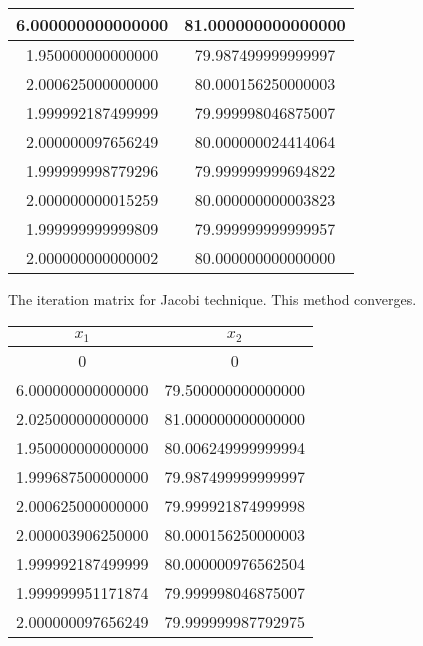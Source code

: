 \documentclass[11pt]{article}
\begin{document}
\begin{exercise}{3}
{\begin{enumerate}[label=\alph*)]
\begin{center}
\begin{tabular}{|c|c|}
                        6.000000000000000 &  81.000000000000000 \\ \hline
                        1.950000000000000 &  79.987499999999997 \\ \hline
                        2.000625000000000 &  80.000156250000003 \\ \hline
                        1.999992187499999 &  79.999998046875007 \\ \hline
                        2.000000097656249 &  80.000000024414064 \\ \hline
                        1.999999998779296 &  79.999999999694822 \\ \hline
                        2.000000000015259 &  80.000000000003823 \\ \hline
                        1.999999999999809 &  79.999999999999957 \\ \hline
                        2.000000000000002 &  80.000000000000000 \\ \hline
                    \end{tabular}
                \end{center}
                The iteration matrix for Jacobi technique.
                This method converges.
                    \begin{center}
                    \begin{tabular}{|c|c|}
                        \hline
                        $x_1$             &   $x_2$             \\ \hline
                        0                 &   0                 \\ \hline
                        6.000000000000000 &  79.500000000000000 \\ \hline
                        2.025000000000000 &  81.000000000000000 \\ \hline
                        1.950000000000000 &  80.006249999999994 \\ \hline
                        1.999687500000000 &  79.987499999999997 \\ \hline
                        2.000625000000000 &  79.999921874999998 \\ \hline
                        2.000003906250000 &  80.000156250000003 \\ \hline
                        1.999992187499999 &  80.000000976562504 \\ \hline
                        1.999999951171874 &  79.999998046875007 \\ \hline
                        2.000000097656249 &  79.999999987792975 \\ \hline

\end{tabular}
\end{center}
\end{enumerate}}
\end{exercise}
\end{document}
